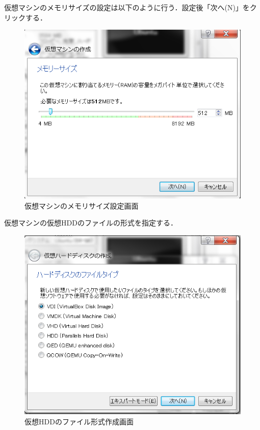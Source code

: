 仮想マシンのメモリサイズの設定は以下のように行う．設定後「次へ(N)」をクリックする．

\begin{figure}[htb]
\centering
\includegraphics[width=15cm]{vb2.png}
\caption{仮想マシンのメモリサイズ設定画面}\label{仮想マシンの設定画面}
\end{figure}

仮想マシンの仮想HDDのファイルの形式を指定する．


\begin{figure}[htb]
\centering
\includegraphics[width=15cm]{vb3.png}
\caption{仮想HDDのファイル形式作成画面}\label{仮想マシンの設定画面}
\end{figure}

